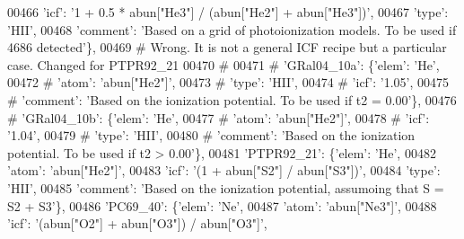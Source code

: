 \begin{DoxyCode}
00466                                       \textcolor{stringliteral}{'icf'}: \textcolor{stringliteral}{'1 + 0.5 * abun["He3"] / (abun["He2"] + abun["He3"])'},
00467                                       \textcolor{stringliteral}{'type'}: \textcolor{stringliteral}{'HII'},
00468                                       \textcolor{stringliteral}{'comment'}: \textcolor{stringliteral}{'Based on a grid of photoionization models. To be used if
       4686 detected'}\},
00469 \textcolor{comment}{# Wrong. It is not a general ICF recipe but a particular case. Changed for PTPR92\_21}
00470 \textcolor{comment}{#}
00471 \textcolor{comment}{#                         'GRal04\_10a': \{'elem': 'He',}
00472 \textcolor{comment}{#                                      'atom': 'abun["He2"]',}
00473 \textcolor{comment}{#                                      'type': 'HII',}
00474 \textcolor{comment}{#                                      'icf': '1.05',}
00475 \textcolor{comment}{#                                      'comment': 'Based on the ionization potential. To be used if t2 =
       0.00'\},}
00476 \textcolor{comment}{#                         'GRal04\_10b': \{'elem': 'He',}
00477 \textcolor{comment}{#                                      'atom': 'abun["He2"]',}
00478 \textcolor{comment}{#                                      'icf': '1.04',}
00479 \textcolor{comment}{#                                      'type': 'HII',}
00480 \textcolor{comment}{#                                      'comment': 'Based on the ionization potential. To be used if t2 >
       0.00'\},}
00481                          \textcolor{stringliteral}{'PTPR92\_21'}: \{\textcolor{stringliteral}{'elem'}: \textcolor{stringliteral}{'He'},
00482                                       \textcolor{stringliteral}{'atom'}: \textcolor{stringliteral}{'abun["He2"]'},
00483                                       \textcolor{stringliteral}{'icf'}: \textcolor{stringliteral}{'(1 + abun["S2"] / abun["S3"])'},
00484                                       \textcolor{stringliteral}{'type'}: \textcolor{stringliteral}{'HII'},
00485                                       \textcolor{stringliteral}{'comment'}: \textcolor{stringliteral}{'Based on the ionization potential, assumoing that S = S2
       + S3'}\},
00486                          \textcolor{stringliteral}{'PC69\_40'}: \{\textcolor{stringliteral}{'elem'}: \textcolor{stringliteral}{'Ne'},
00487                                     \textcolor{stringliteral}{'atom'}: \textcolor{stringliteral}{'abun["Ne3"]'},
00488                                    \textcolor{stringliteral}{'icf'}: \textcolor{stringliteral}{'(abun["O2"] + abun["O3"]) / abun["O3"]'},

\end{DoxyCode}
